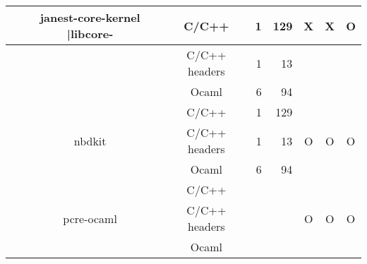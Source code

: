\documentclass[11pt,a4paper]{article}
\begin{document}
\begin{table}[h,t]
\begin{tabular}{|>{\centering}m{3cm}| c|c|r|r| c| c|c|}
&\multirow{3}{3cm}{janest-core-kernel |libcore-} & C/C++ & 1 & 129 & \multirow{3}{*}{X} & \multirow{3}{*}{X} & \multirow{3}{*}{O}\\
\cline{3-5}
& &                           C/C++ headers & 1 & 13 & & & \\
\cline{3-5}
& &                          Ocaml & 6 & 94 & & & \\
\cline{2-8}


 &\multirow{3}{3cm}{nbdkit} & C/C++ & 1 & 129 & \multirow{3}{*}{O} & \multirow{3}{*}{O} & \multirow{3}{*}{O}\\
\cline{3-5}
& &                           C/C++ headers & 1 & 13 & & & \\
\cline{3-5}
& &                          Ocaml & 6 & 94 & & & \\
\cline{2-8}



 &\multirow{3}{*}{pcre-ocaml} & C/C++ &  &  & \multirow{3}{*}{O} & \multirow{3}{*}{O} & \multirow{3}{*}{O}\\
 \cline{3-5}
 & &                           C/C++ headers &  &  & & & \\
 \cline{3-5}
 & &                          Ocaml &  &  & & & \\
 \hline



\end{tabular}
\end{table}


\end{document}
